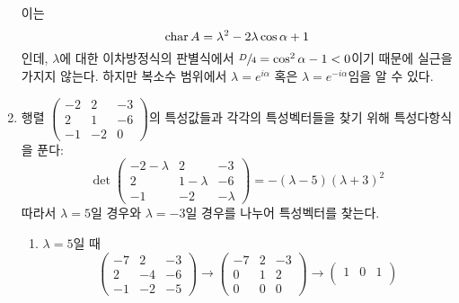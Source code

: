 \documentclass[sections/engineering_mathematics_lecture_note.tex]{subfiles}
\begin{document}
\begin{example}
\begin{enumerate}
            이는
            \begin{equation*}
                \operatorname{char} A = \lambda^2 - 2 \lambda \cos \alpha + 1
            \end{equation*}
            인데, $\lambda$에 대한 이차방정식의 판별식에서 $\sfrac D4 = \cos^2 \alpha - 1 < 0$이기 때문에 실근을 가지지 않는다.
            하지만 복소수 범위에서 $\lambda = e^{i \alpha}$ 혹은 $\lambda = e^{-i \alpha}$임을 알 수 있다.
        \item 행렬  $\begin{pmatrix}-2 & 2 & -3\\2 & 1 & -6\\-1 & -2 & 0\end{pmatrix}$의 특성값들과 각각의 특성벡터들을 찾기 위해 특성다항식을 푼다:
            \begin{equation*}
                \det
                \begin{pmatrix}
                    -2 - \lambda & 2 & -3\\
                    2 & 1 - \lambda & -6\\
                    -1 & -2 & -\lambda
                \end{pmatrix}
                = - (\lambda - 5)(\lambda + 3)^2
            \end{equation*}
            따라서 $\lambda = 5$일 경우와 $\lambda = -3$일 경우를 나누어 특성벡터를 찾는다.
            \begin{enumerate}
                \item $\lambda = 5$일 때
                    \begin{equation*}
                        \begin{pmatrix}
                            -7 & 2 & -3\\
                            2 & -4 & -6\\
                            -1 & -2 & -5
                        \end{pmatrix}
                        \rightarrow
                        \begin{pmatrix}
                            -7 & 2 & -3\\
                            0 & 1 & 2\\
                            0 & 0 & 0
                        \end{pmatrix}
                        \rightarrow
                        \begin{pmatrix}
                            1 & 0 & 1\\

\end{pmatrix}
\end{equation*}
\end{enumerate}
\end{enumerate}
\end{example}
\end{document}
